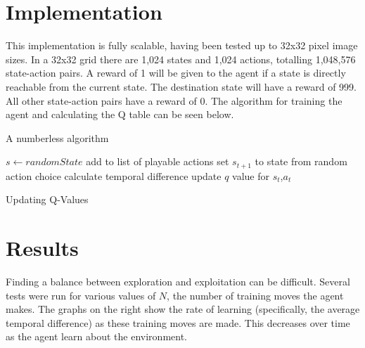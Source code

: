 \documentclass[]{article}
\begin{document}
\section{Implementation}

This implementation is fully scalable, having been tested up to 32x32 pixel image sizes. In a 32x32 grid there are 1,024 states and 1,024 actions, totalling 1,048,576 state-action pairs. A reward of 1 will be given to the agent if a state is directly reachable from the current state. The destination state will have a reward of 999. All other state-action pairs have a reward of 0. The algorithm for training the agent and calculating the Q table can be seen below.

\begin{algorithm}
	\renewcommand\thealgorithm{}
	\caption{A numberless algorithm}
\begin{algorithmic}[H]

\STATE $s\gets random State$
\STATE add to list of playable actions
\ENDIF
\STATE set $s_{t+1}$ to state from random action choice
\STATE calculate temporal difference
\STATE update $q$ value for $s_t$,$a_t$
\ENDFOR
\ENDFOR

\caption{Updating Q-Values}

\end{algorithmic}
\addtocounter{algorithm}{-1}
\end{algorithm}


\section{Results}

Finding a balance between exploration and exploitation can be difficult. Several tests were run for various values of $N$, the number of training moves the agent makes. The graphs on the right show the rate of learning (specifically, the average temporal difference) as these training moves are made. This decreases over time as the agent learn about the environment.

\clearpage
\end{document}

